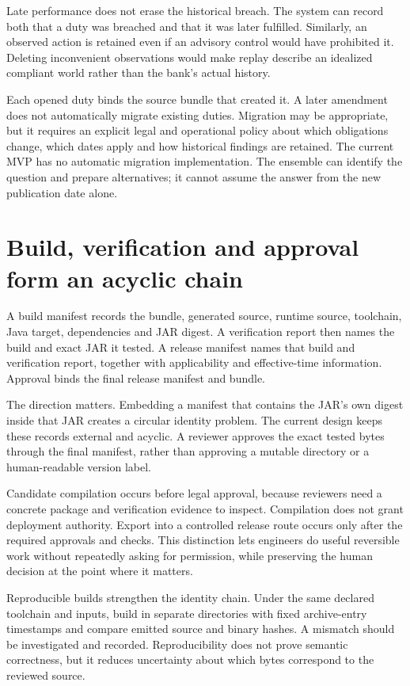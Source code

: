 Late performance does not erase the historical breach. The system can record both
that a duty was breached and that it was later fulfilled. Similarly, an observed
action is retained even if an advisory control would have prohibited it. Deleting
inconvenient observations would make replay describe an idealized compliant world
rather than the bank's actual history.

Each opened duty binds the source bundle that created it. A later amendment does
not automatically migrate existing duties. Migration may be appropriate, but it
requires an explicit legal and operational policy about which obligations change,
which dates apply and how historical findings are retained. The current MVP has
no automatic migration implementation. The ensemble can identify the question
and prepare alternatives; it cannot assume the answer from the new publication
date alone.

\section{Build, verification and approval form an acyclic chain}

A build manifest records the bundle, generated source, runtime source, toolchain,
Java target, dependencies and JAR digest. A verification report then names the
build and exact JAR it tested. A release manifest names that build and verification
report, together with applicability and effective-time information. Approval
binds the final release manifest and bundle.

The direction matters. Embedding a manifest that contains the JAR's own digest
inside that JAR creates a circular identity problem. The current design keeps
these records external and acyclic. A reviewer approves the exact tested bytes
through the final manifest, rather than approving a mutable directory or a
human-readable version label.

Candidate compilation occurs before legal approval, because reviewers need a
concrete package and verification evidence to inspect. Compilation does not grant
deployment authority. Export into a controlled release route occurs only after
the required approvals and checks. This distinction lets engineers do useful
reversible work without repeatedly asking for permission, while preserving the
human decision at the point where it matters.

Reproducible builds strengthen the identity chain. Under the same declared
toolchain and inputs, build in separate directories with fixed archive-entry
timestamps and compare emitted source and binary hashes. A mismatch should be
investigated and recorded. Reproducibility does not prove semantic correctness,
but it reduces uncertainty about which bytes correspond to the reviewed source.

